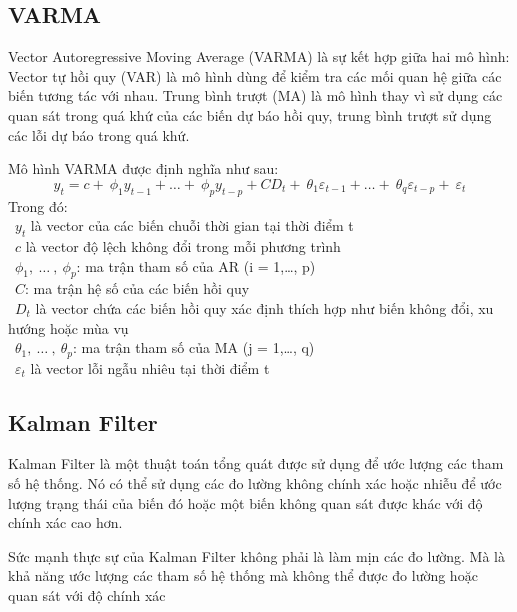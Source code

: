 \subsection{VARMA}
Vector Autoregressive Moving Average (VARMA) là sự kết hợp giữa hai mô hình: Vector tự hồi quy (VAR) là mô hình dùng để kiểm tra các mối quan hệ giữa các biến tương tác với nhau. Trung bình trượt (MA) là mô hình thay vì sử dụng các quan sát trong quá khứ của các biến dự báo hồi quy, trung bình trượt sử dụng các lỗi dự báo trong quá khứ. 
\par
Mô hình VARMA được định nghĩa như sau:
\[y_{t} = c + \ \phi_{1}y_{t - 1} + \ldots + \ \phi_{p}y_{t - p} + CD_{t} + \ \theta_{1}\varepsilon_{t - 1} + \ldots + \ \theta_{q}\varepsilon_{t - p} + \ \varepsilon_{t}\]
Trong đó:\\
    \indent\textbullet\ \(y_{t}\) là vector của các biến chuỗi thời gian tại thời điểm t\\
    \indent\textbullet\ \(c\) là vector độ lệch không đổi trong mỗi phương trình\\
    \indent\textbullet\ \(\phi_{1},\ \ldots\ ,\ \phi_{p}\): ma trận tham số của AR (i = 1,…, p)\\
    \indent\textbullet\ \(C\): ma trận hệ số của các biến hồi quy\\
    \indent\textbullet\ \(D_{t}\) là vector chứa các biến hồi quy xác định thích hợp như biến không đổi, xu hướng hoặc mùa vụ\\
    \indent\textbullet\ \(\theta_{1},\ \ldots\ ,\ \theta_{p}\): ma trận tham số của MA (j = 1,…, q)\\
    \indent\textbullet\ \(\varepsilon_{t}\) là vector lỗi ngẫu nhiêu tại thời điểm t
\subsection{Kalman Filter}
Kalman Filter là một thuật toán tổng quát được sử dụng để ước lượng các tham số hệ thống. Nó có thể sử dụng các đo lường không chính xác hoặc nhiễu để ước lượng trạng thái của biến đó hoặc một biến không quan sát được khác với độ chính xác cao hơn.

Sức mạnh thực sự của Kalman Filter không phải là làm mịn các đo lường. Mà là khả năng ước lượng các tham số hệ thống mà không thể được đo lường hoặc quan sát với độ chính xác\\

